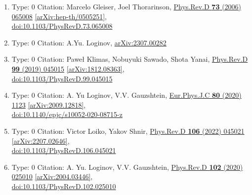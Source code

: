 \documentclass[a4paper,10pt]{article}
\begin{document}
\begin{enumerate}
\begin{enumerate}
  \item Type: 0 Citation: Marcelo Gleiser, Joel Thorarinson, \href{https://www.doi.org/10.1103/PhysRevD.73.065008}{Phys.Rev.D {\bf 73} (2006) 065008}  \href{https://arxiv.org/abs/hep-th/0505251}{[arXiv:hep-th/0505251]},\\\href{https://www.doi.org/10.1103/PhysRevD.73.065008}{doi:10.1103/PhysRevD.73.065008}
  \item Type: 0 Citation: A.Yu. Loginov, \href{https://arxiv.org/abs/2307.00282}{arXiv:2307.00282}
  \item Type: 0 Citation: Paweł Klimas, Nobuyuki Sawado, Shota Yanai, \href{https://www.doi.org/10.1103/PhysRevD.99.045015}{Phys.Rev.D {\bf 99} (2019) 045015}  \href{https://arxiv.org/abs/1812.08363}{[arXiv:1812.08363]},\\\href{https://www.doi.org/10.1103/PhysRevD.99.045015}{doi:10.1103/PhysRevD.99.045015}
  \item Type: 0 Citation: A. Yu Loginov, V.V. Gauzshtein, \href{https://www.doi.org/10.1140/epjc/s10052-020-08715-z}{Eur.Phys.J.C {\bf 80} (2020) 1123}  \href{https://arxiv.org/abs/2009.12818}{[arXiv:2009.12818]},\\\href{https://www.doi.org/10.1140/epjc/s10052-020-08715-z}{doi:10.1140/epjc/s10052-020-08715-z}
  \item Type: 0 Citation: Victor Loiko, Yakov Shnir, \href{https://www.doi.org/10.1103/PhysRevD.106.045021}{Phys.Rev.D {\bf 106} (2022) 045021}  \href{https://arxiv.org/abs/2207.02646}{[arXiv:2207.02646]},\\\href{https://www.doi.org/10.1103/PhysRevD.106.045021}{doi:10.1103/PhysRevD.106.045021}
  \item Type: 0 Citation: A. Yu. Loginov, V.V. Gauzshtein, \href{https://www.doi.org/10.1103/PhysRevD.102.025010}{Phys.Rev.D {\bf 102} (2020) 025010}  \href{https://arxiv.org/abs/2004.03446}{[arXiv:2004.03446]},\\\href{https://www.doi.org/10.1103/PhysRevD.102.025010}{doi:10.1103/PhysRevD.102.025010}

\end{enumerate}
\end{enumerate}
\end{document}
